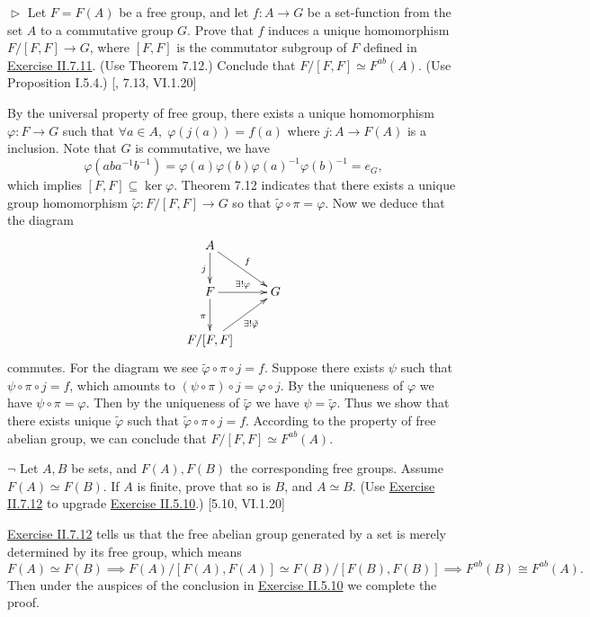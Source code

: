 \documentclass[12pt,letterpaper,boxed]{hmcpset}
\begin{document}
\hypertarget{Exercise II.7.12}{}
\begin{problem}[7.12]
$\vartriangleright$ Let $F = F(A)$ be a free group, and let $f : A\to G$ be a set-function
from the set $A$ to a commutative group $G$. Prove that $f$ induces a unique homomorphism $F/[F, F]\to G$, where $[F, F]$ is the commutator subgroup of $F$ defined in \hyperlink{Exercise II.7.11}{Exercise II.7.11}. (Use Theorem 7.12.) Conclude that $F/[F, F]\simeq F^{ab}(A)$. (Use Proposition I.5.4.) [, 7.13, VI.1.20]
\end{problem}
\begin{solution}
By the universal property of free group, there exists a unique homomorphism $\varphi:F\to G$ such that $\forall a\in A,\;\varphi(j(a))=f(a)$ 
where $j:A\to F(A)$ is a inclusion. Note that $G$ is commutative, we have
\[
\varphi(aba^{-1}b^{-1})=\varphi(a)\varphi(b)\varphi(a)^{-1}\varphi(b)^{-1}=e_G,
\]
which implies $[F,F]\subseteq \ker\varphi$. Theorem 7.12 indicates that there exists a unique group homomorphism $\tilde{\varphi}:F/[F, F]\to G$ so that $\tilde{\varphi}\circ\pi=\varphi$. Now we deduce that the diagram
\[\xymatrix{
	A\ar@{->}[d]_{j}\ar@{->}[rd]^{f} \\
	F\ar@{->}[r]^{\exists!\varphi}\ar@{->}[d]_{\pi} & G\\
	F/[F,F]\ar@{->}[ru]_{\exists!\tilde{\varphi}}  
}\]
commutes. For the diagram we see $\tilde{\varphi}\circ\pi\circ j=f$. Suppose there exists $\psi$ such that $\psi\circ\pi\circ j=f$, which amounts to $(\psi\circ\pi)\circ j=\varphi\circ j$. By the uniqueness of $\varphi$ we have $\psi\circ\pi=\varphi$. Then by the uniqueness of $\tilde{\varphi}$ we have $\psi=\tilde{\varphi}$. Thus we show that there exists unique $\tilde{\varphi}$ such that $\tilde{\varphi}\circ\pi\circ j=f$. According to the property of free abelian group, we can conclude that $F/[F, F]\simeq F^{ab}(A)$.
\end{solution}

\begin{problem}[7.13]
$\neg$ Let $A, B$ be sets, and $F(A), F(B)$ the corresponding free groups. Assume $F(A)\simeq F(B)$. If $A$ is finite, prove that so is $B$, and $A\simeq B$. (Use \hyperlink{Exercise II.7.12}{Exercise II.7.12} to upgrade \hyperlink{Exercise II.5.10}{Exercise II.5.10}.) [5.10, VI.1.20]
\end{problem}
\begin{solution}
\hyperlink{Exercise II.7.12}{Exercise II.7.12} tells us that the free abelian group generated by a set is merely determined by its free group, which means
\[
F(A)\simeq F(B)\implies F(A)/[F(A),F(A)]\simeq F(B)/[F(B),F(B)]\implies F^{ab}(B)\cong F^{ab}(A).
\]
Then under the auspices of the conclusion in \hyperlink{Exercise II.5.10}{Exercise II.5.10} we complete the proof.
\end{solution}
\end{document}

